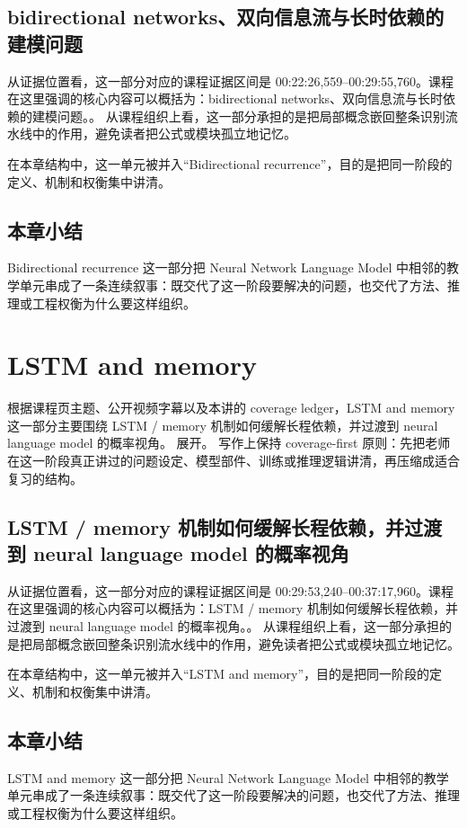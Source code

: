 \documentclass[a4paper]{article}
\begin{document}
\subsection{bidirectional networks、双向信息流与长时依赖的建模问题}
从证据位置看，这一部分对应的课程证据区间是 00:22:26,559--00:29:55,760。课程在这里强调的核心内容可以概括为：bidirectional networks、双向信息流与长时依赖的建模问题。。
从课程组织上看，这一部分承担的是把局部概念嵌回整条识别流水线中的作用，避免读者把公式或模块孤立地记忆。

在本章结构中，这一单元被并入“Bidirectional recurrence”，目的是把同一阶段的定义、机制和权衡集中讲清。

\subsection{本章小结}
Bidirectional recurrence 这一部分把 Neural Network Language Model 中相邻的教学单元串成了一条连续叙事：既交代了这一阶段要解决的问题，也交代了方法、推理或工程权衡为什么要这样组织。

\section{LSTM and memory}
根据课程页主题、公开视频字幕以及本讲的 coverage ledger，LSTM and memory 这一部分主要围绕 LSTM / memory 机制如何缓解长程依赖，并过渡到 neural language model 的概率视角。 展开。
写作上保持 coverage-first 原则：先把老师在这一阶段真正讲过的问题设定、模型部件、训练或推理逻辑讲清，再压缩成适合复习的结构。

\subsection{LSTM / memory 机制如何缓解长程依赖，并过渡到 neural language model 的概率视角}
从证据位置看，这一部分对应的课程证据区间是 00:29:53,240--00:37:17,960。课程在这里强调的核心内容可以概括为：LSTM / memory 机制如何缓解长程依赖，并过渡到 neural language model 的概率视角。。
从课程组织上看，这一部分承担的是把局部概念嵌回整条识别流水线中的作用，避免读者把公式或模块孤立地记忆。

在本章结构中，这一单元被并入“LSTM and memory”，目的是把同一阶段的定义、机制和权衡集中讲清。

\subsection{本章小结}
LSTM and memory 这一部分把 Neural Network Language Model 中相邻的教学单元串成了一条连续叙事：既交代了这一阶段要解决的问题，也交代了方法、推理或工程权衡为什么要这样组织。
\end{document}
